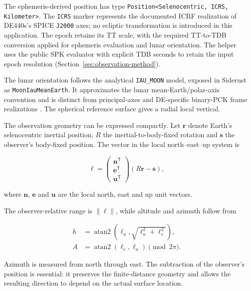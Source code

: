 The ephemeris-derived position has type \texttt{Position<Selenocentric, ICRS, Kilometer>}. The
\texttt{ICRS} marker represents the documented ICRF realization of DE440s's SPICE \texttt{J2000}
axes; no ecliptic transformation is introduced in this application. The epoch retains its TT scale,
with the required TT-to-TDB conversion applied for ephemeris evaluation and lunar orientation. The
helper uses the public SPK evaluator with explicit TDB seconds to retain the input epoch resolution
(Section~\ref{sec:observation-method}).

The lunar orientation follows the analytical \texttt{IAU\_MOON} model, exposed in Siderust as
\texttt{MoonIauMeanEarth}. It approximates the lunar mean-Earth/polar-axis convention and is
distinct from principal-axes and DE-specific binary-PCK frame realizations
\cite{archinal2011,naiflunarframes}. The spherical reference surface gives a radial local vertical.

The observation geometry can be expressed compactly. Let $\boldsymbol r$ denote Earth's
selenocentric inertial position, $R$ the inertial-to-body-fixed rotation and $\boldsymbol s$ the
observer's body-fixed position. The vector in the local north--east--up system is

\begin{equation}
    \boldsymbol\ell =
    \begin{pmatrix}
        \boldsymbol n^{\mathsf T} \\
        \boldsymbol e^{\mathsf T} \\
        \boldsymbol u^{\mathsf T}
    \end{pmatrix}
    (R\boldsymbol r-\boldsymbol s),
\end{equation}

where $\boldsymbol n$, $\boldsymbol e$ and $\boldsymbol u$ are the local north, east and up unit
vectors.

The observer-relative range is $\lVert\boldsymbol\ell\rVert$, while altitude and azimuth follow
from

\begin{align}
    h & =
    \operatorname{atan2}
    \left(
    \ell_u,
    \sqrt{\ell_n^2+\ell_e^2}
    \right), \\
    A & =
    \operatorname{atan2}(\ell_e,\ell_n)
    \pmod{2\pi}.
\end{align}

Azimuth is measured from north through east. The subtraction of the observer's position is
essential: it preserves the finite-distance geometry and allows the resulting direction to depend
on the actual surface location.

